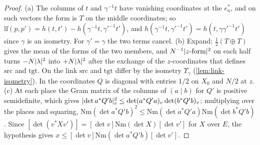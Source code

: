 \begin{proof}
(a) The columns of $t$ and $\gamma^{-1}t$ have vanishing coordinates at the $e^*_a$, and on such vectors the form is $T$ on the middle coordinates; so $\mathrm{lf}(p,p')=h(t,t')-h(\gamma^{-1}t,\gamma'^{-1}t')$, and $h(\gamma^{-1}t,\gamma'^{-1}t')=h(t,\gamma\gamma'^{-1}t')$
since $\gamma$ is an isometry. For $\gamma'=\gamma$ the two terms cancel. (b) Expand: $\frac12(T\oplus T)$ gives the mean of the forms of the two members, and $N^{-1}\lvert \text{$z$-form}\rvert^2$ on each half turns $-N\lvert \lambda\rvert^2$ into
$+N\lvert \lambda\rvert^2$ after the exchange of the $z$-coordinates that defines $\mathrm{src}$ and $\mathrm{tgt}$. On the link $\mathrm{src}$ and $\mathrm{tgt}$ differ by the isometry $\Upsilon_\gamma$ (\cref{lem:link-isometry}). In the coordinates $Q$ is
diagonal with entries $1/2$ on $X_0$ and $N/2$ at $z$. (c) At each place the Gram matrix of the columns of $(a\mid b)$ for $Q'$ is positive semidefinite, which gives
$\lvert \det a^*Q'b\rvert_v^2\le\det(a^*Q'a)_v\det(b^*Q'b)_v$; multiplying over the places and squaring, $\mathrm{Nm}(\det a^*Q'b)^2\le\mathrm{Nm}(\det a^*Q'a)\mathrm{Nm}(\det b^*Q'b)$. Since $[\det(v^*Xv')]=[\det v]\mathrm{Nm}(\det X)[\det v']$ for $X$ over $E$,
the hypothesis gives $x\le[\det v]\mathrm{Nm}(\det a^*Q'b)[\det v']$.
\end{proof}

